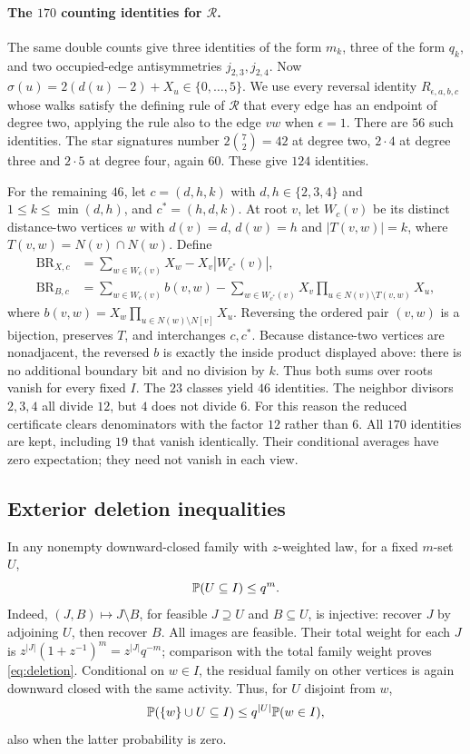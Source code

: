 \documentclass[11pt]{article}
\begin{document}
\paragraph{The $170$ counting identities for $\mathcal R$.}
The same double counts give three identities of the form $m_k$, three of the form $q_k$, and two occupied-edge antisymmetries $j_{2,3},j_{2,4}$. Now $\sigma(u)=2(d(u)-2)+X_u\in\{0,\ldots,5\}$. We use every reversal identity $R_{\epsilon,a,b,c}$ whose walks satisfy the defining rule of $\mathcal R$ that every edge has an endpoint of degree two, applying the rule also to the edge $vw$ when $\epsilon=1$. There are $56$ such identities. The star signatures number $2\binom72=42$ at degree two, $2\cdot4$ at degree three and $2\cdot5$ at degree four, again $60$. These give $124$ identities.

For the remaining $46$, let $c=(d,h,k)$ with $d,h\in\{2,3,4\}$ and $1\le k\le\min(d,h)$, and $c^*=(h,d,k)$. At root $v$, let $W_c(v)$ be its distinct distance-two vertices $w$ with $d(v)=d$, $d(w)=h$ and $|T(v,w)|=k$, where $T(v,w)=N(v)\cap N(w)$. Define
\begin{align*}
 \mathrm{BR}_{X,c}&=\sum_{w\in W_c(v)}X_w-X_v|W_{c^*}(v)|,\\
 \mathrm{BR}_{B,c}&=\sum_{w\in W_c(v)}b(v,w)
 -\sum_{w\in W_{c^*}(v)}X_v\prod_{u\in N(v)\setminus T(v,w)}X_u,
\end{align*}
where $b(v,w)=X_w\prod_{u\in N(w)\setminus N[v]}X_u$. Reversing the ordered pair $(v,w)$ is a bijection, preserves $T$, and interchanges $c,c^*$. Because distance-two vertices are nonadjacent, the reversed $b$ is exactly the inside product displayed above: there is no additional boundary bit and no division by $k$. Thus both sums over roots vanish for every fixed $I$. The $23$ classes yield $46$ identities. The neighbor divisors $2,3,4$ all divide $12$, but $4$ does not divide $6$. For this reason the reduced certificate clears denominators with the factor $12$ rather than $6$. All $170$ identities are kept, including $19$ that vanish identically. Their conditional averages have zero expectation; they need not vanish in each view.

\subsection{Exterior deletion inequalities}
In any nonempty downward-closed family with $z$-weighted law, for a fixed $m$-set $U$,
\begin{equation}\label{eq:deletion}
 \mathbb P(U\subseteq I)\le q^m.
\end{equation}
Indeed, $(J,B)\mapsto J\setminus B$, for feasible $J\supseteq U$ and $B\subseteq U$, is injective: recover $J$ by adjoining $U$, then recover $B$. All images are feasible. Their total weight for each $J$ is $z^{|J|}(1+z^{-1})^m=z^{|J|}q^{-m}$; comparison with the total family weight proves \eqref{eq:deletion}. Conditional on $w\in I$, the residual family on other vertices is again downward closed with the same activity. Thus, for $U$ disjoint from $w$,
\[
 \mathbb P(\{w\}\cup U\subseteq I)\le q^{|U|}\mathbb P(w\in I),
\]
also when the latter probability is zero.
\end{document}
